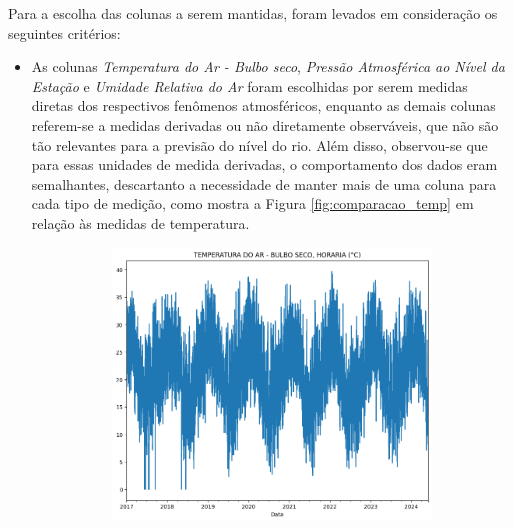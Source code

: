 Para a escolha das colunas a serem mantidas, foram levados em consideração os seguintes critérios:
\begin{itemize}
	\item As colunas \textit{Temperatura do Ar - Bulbo seco}, \textit{Pressão Atmosférica ao Nível da Estação} e \textit{Umidade Relativa do Ar} foram escolhidas por serem medidas diretas dos respectivos fenômenos atmosféricos, enquanto as demais colunas referem-se a medidas derivadas ou não diretamente observáveis, que não são tão relevantes para a previsão do nível do rio. Além disso, observou-se que para essas unidades de medida derivadas, o comportamento dos dados eram semalhantes, descartanto a necessidade de manter mais de uma coluna para cada tipo de medição, como mostra a Figura \ref{fig:comparacao_temp} em relação às medidas de temperatura.
	\begin{figure}[H]
	\caption{\label{fig:comparacao_temp}Comparativo de gráficos de temperatura em diferentes tipos de medição}
	\begin{center}
		\begin{subfigure}{0.35\textwidth}
			\includegraphics[width=\linewidth]{figuras/comparacao_temp_1.png}
		\end{subfigure}
		\begin{subfigure}{0.35\textwidth}

\end{subfigure}
\end{center}
\end{figure}
\end{itemize}
